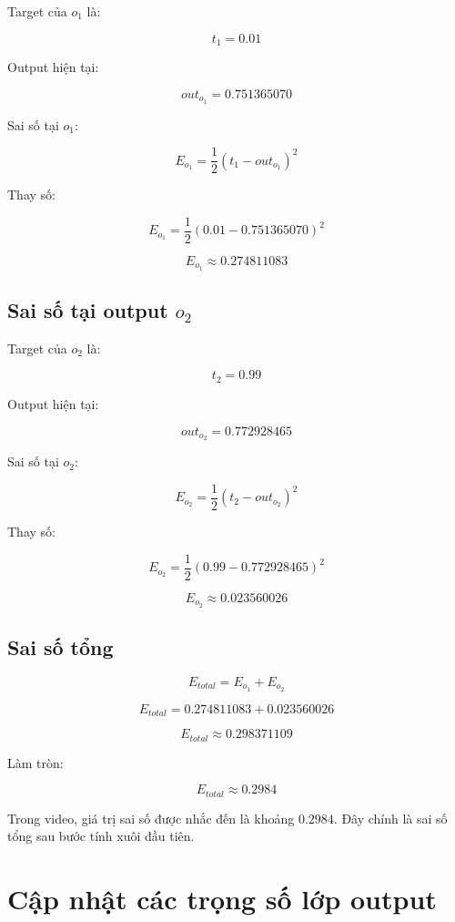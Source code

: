 \documentclass[12pt,a4paper]{report}
\begin{document}
Target của $o_1$ là:

\[
    t_1=0.01
\]

Output hiện tại:

\[
    out_{o_1}=0.751365070
\]

Sai số tại $o_1$:

\[
    E_{o_1}
    =
    \frac{1}{2}
    (t_1-out_{o_1})^2
\]

Thay số:

\[
    E_{o_1}
    =
    \frac{1}{2}
    (0.01-0.751365070)^2
\]

\[
    E_{o_1}\approx 0.274811083
\]

\section{Sai số tại output $o_2$}

Target của $o_2$ là:

\[
    t_2=0.99
\]

Output hiện tại:

\[
    out_{o_2}=0.772928465
\]

Sai số tại $o_2$:

\[
    E_{o_2}
    =
    \frac{1}{2}
    (t_2-out_{o_2})^2
\]

Thay số:

\[
    E_{o_2}
    =
    \frac{1}{2}
    (0.99-0.772928465)^2
\]

\[
    E_{o_2}\approx 0.023560026
\]

\section{Sai số tổng}

\[
    E_{total}=E_{o_1}+E_{o_2}
\]

\[
    E_{total}
    =
    0.274811083
    +
    0.023560026
\]

\[
    E_{total}\approx 0.298371109
\]

Làm tròn:

\[
    E_{total}\approx 0.2984
\]

\begin{ghinho}
Trong video, giá trị sai số được nhắc đến là khoảng $0.2984$. Đây chính là sai số tổng sau bước tính xuôi đầu tiên.
\end{ghinho}

\chapter{Cập nhật các trọng số lớp output}
\end{document}
